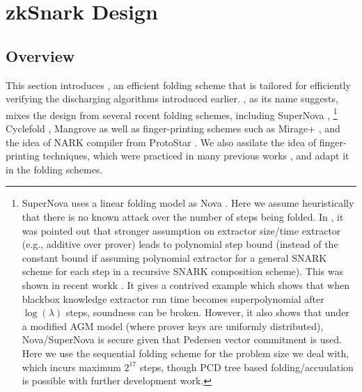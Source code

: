 \section{zkSnark Design}
\subsection{Overview}
This section introduces 
\foldpot,
an efficient folding scheme
that is tailored for efficiently verifying
the discharging algorithms introduced earlier.
\foldpot, as its name suggests, mixes
the design from several
recent folding schemes, including
SuperNova \cite{SuperNova}, \footnote{SuperNova uses a linear
folding model as Nova \cite{Nova}. 
Here we assume heuristically
that there is no known attack over the number of steps being folded.
In \cite[Remark 6.3]{BCCT13}, it was pointed out that stronger assumption on
extractor size/time extractor (e.g., additive over prover) leads
to polynomial step bound (instead of the constant bound if
assuming polynomial extractor for a general SNARK scheme for each step
in a recursive SNARK composition scheme).
This was shown in recent workk \cite{AGMRecursion}.
It gives a contrived example
which shows that when blackbox knowledge extractor run time becomes
superpolynomial after $\log(\lambda)$ steps, soundness can be broken.
However, it also shows that under a modified AGM model (where prover keys
are uniformly distributed), Nova/SuperNova is secure given that
Pedersen vector commitment is used. Here
we use the sequential folding scheme for the problem size
we deal with, which incurs maximum $2^{17}$ steps, though
PCD tree based folding/accuulation is possible with further
development work.}
Cyclefold \cite{CycleFold}, Mangrove \cite{Mangrove} as well as
finger-printing schemes such as Mirage+ \cite{AIPRam}, and the
idea of NARK compiler from ProtoStar \cite{ProtoStar}.
We also assilate the idea of finger-printing techniques,
which were practiced in many previous works \cite{Mirage,AIPRam,Zkreg},
and adapt it in the folding schemes.

